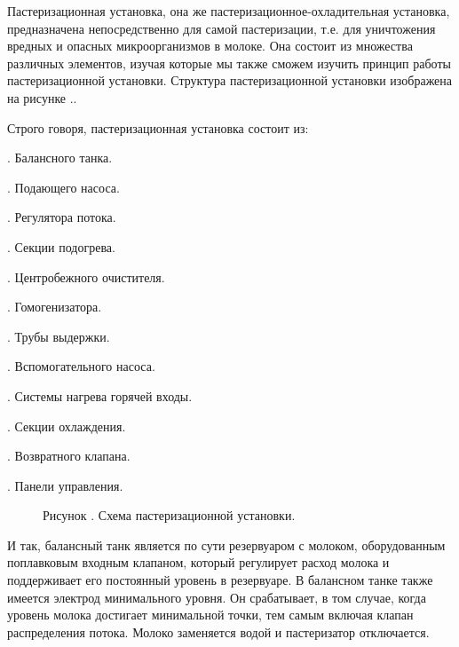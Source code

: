 {\gostFont

  \par \redline Пастеризационная установка, она же пастеризационное-охладительная установка, предназначена непосредственно для самой пастеризации, т.е. для уничтожения вредных и опасных микроорганизмов в молоке. Она состоит из множества различных элементов, изучая которые мы также сможем изучить принцип работы пастеризационной установки. Структура пастеризационной установки изображена на рисунке \thechaptercntr .\theimagecntr.

  \par \redline Строго говоря, пастеризационная установка состоит из:

  \par {}. Балансного танка.
  \par {}. Подающего насоса.
  \par {}. Регулятора потока.
  \par {}. Секции подогрева.
  \par {}. Центробежного очистителя.
  \par {}. Гомогенизатора.
  \par {}. Трубы выдержки.
  \par {}. Вспомогательного насоса.
  \par {}. Системы нагрева горячей входы.
  \par {}. Секции охлаждения.
  \par {}. Возвратного клапана.
  \par {}. Панели управления.

  \begin{figure}
    \centering
    \def\svgwidth{\textwidth}
    
    \caption*{\gostFont Рисунок \thechaptercntr .\theimagecntr \spc {--} Схема пастеризационной установки.}
    \label{fig:Data1Visual}
  \end{figure} \addtocounter{imagecntr}{1}

  \par \redline И так, балансный танк является по сути резервуаром с молоком, оборудованным поплавковым входным клапаном, который регулирует расход молока и поддерживает его постоянный уровень в резервуаре. В балансном танке также имеется электрод минимального уровня. Он срабатывает, в том случае, когда уровень молока достигает минимальной точки, тем самым включая клапан распределения потока. Молоко заменяется водой и пастеризатор отключается.

}
